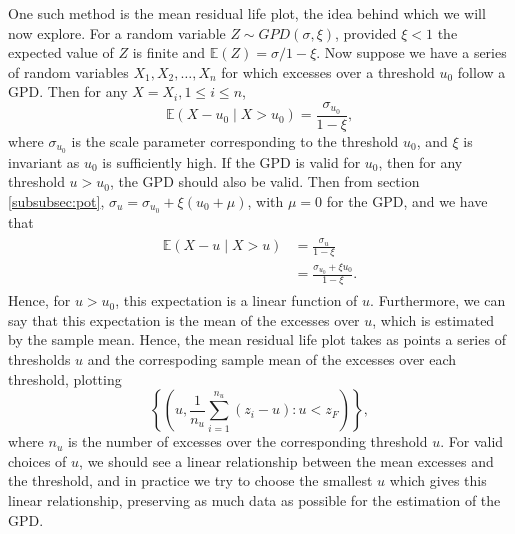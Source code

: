 \documentclass{article}
\numberwithin{equation}{section}
\begin{document}
One such method is the mean residual life plot, the idea behind which we will now explore. 
For a random variable $Z \sim GPD(\sigma, \xi)$, provided $\xi < 1$ the expected value of $Z$ is finite and $\mathbb{E}(Z) = \sigma/1 - \xi$.
Now suppose we have a series of random variables $X_1, X_2, \ldots, X_n$ for which excesses over a threshold $u_0$ follow a GPD. 
Then for any $X = X_i, 1 \le i \le n$, 
\[
  \mathbb{E}(X - u_0 \mid X > u_0) = \frac{\sigma_{u_0}}{1 - \xi},
\]
where $\sigma_{u_0}$ is the scale parameter corresponding to the threshold $u_0$, and $\xi$ is invariant as $u_0$ is sufficiently high.
If the GPD is valid for $u_0$, then for any threshold $u > u_0$, the GPD should also be valid.
Then from section \ref{subsubsec:pot}, $\sigma_u = \sigma_{u_0} + \xi(u_0 + \mu)$, with $\mu = 0$ for the GPD, and we have that 
\begin{align} \label{eq:lin_u}
  \begin{split}
  \mathbb{E}(X - u \mid X > u) &= \frac{\sigma_u}{1 - \xi} \\
                                   &= \frac{\sigma_{u_0} + \xi u_0}{1-\xi}.
  \end{split}
\end{align}
Hence, for $u > u_0$, this expectation is a linear function of $u$. 
Furthermore, we can say that this expectation is the mean of the excesses over $u$, which is estimated by the sample mean. 
Hence, the mean residual life plot takes as points a series of thresholds $u$ and the correspoding sample mean of the excesses over each threshold, plotting
\[
  \left\{\left( u, \frac{1}{n_u} \sum_{i=1}^{n_u}{\left(z_i - u\right)}: u < z_{F} \right) \right\},
\]
where $n_u$ is the number of excesses over the corresponding threshold $u$.
For valid choices of $u$, we should see a linear relationship between the mean excesses and the threshold, and in practice we try to choose the smallest $u$ which gives this linear relationship, preserving as much data as possible for the estimation of the GPD.
\end{document}
